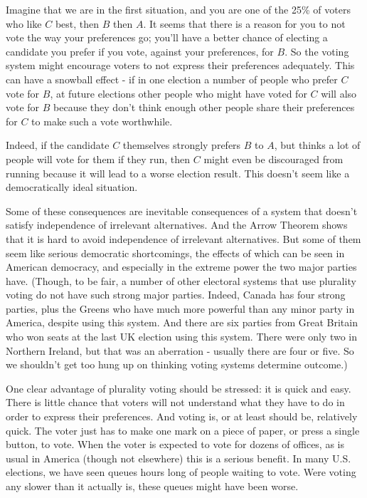 \documentclass[11pt,]{article}
\begin{document}
Imagine that we are in the first situation, and you are one of the 25\%
of voters who like \(C\) best, then \(B\) then \(A\). It seems that
there is a reason for you to not vote the way your preferences go;
you'll have a better chance of electing a candidate you prefer if you
vote, against your preferences, for \(B\). So the voting system might
encourage voters to not express their preferences adequately. This can
have a snowball effect - if in one election a number of people who
prefer \(C\) vote for \(B\), at future elections other people who might
have voted for \(C\) will also vote for \(B\) because they don't think
enough other people share their preferences for \(C\) to make such a
vote worthwhile.

Indeed, if the candidate \(C\) themselves strongly prefers \(B\) to
\(A\), but thinks a lot of people will vote for them if they run, then
\(C\) might even be discouraged from running because it will lead to a
worse election result. This doesn't seem like a democratically ideal
situation.

Some of these consequences are inevitable consequences of a system that
doesn't satisfy independence of irrelevant alternatives. And the Arrow
Theorem shows that it is hard to avoid independence of irrelevant
alternatives. But some of them seem like serious democratic
shortcomings, the effects of which can be seen in American democracy,
and especially in the extreme power the two major parties have. (Though,
to be fair, a number of other electoral systems that use plurality
voting do not have such strong major parties. Indeed, Canada has four
strong parties, plus the Greens who have much more powerful than any
minor party in America, despite using this system. And there are six
parties from Great Britain who won seats at the last UK election using
this system. There were only two in Northern Ireland, but that was an
aberration - usually there are four or five. So we shouldn't get too
hung up on thinking voting systems determine outcome.)

One clear advantage of plurality voting should be stressed: it is quick
and easy. There is little chance that voters will not understand what
they have to do in order to express their preferences. And voting is, or
at least should be, relatively quick. The voter just has to make one
mark on a piece of paper, or press a single button, to vote. When the
voter is expected to vote for dozens of offices, as is usual in America
(though not elsewhere) this is a serious benefit. In many U.S.
elections, we have seen queues hours long of people waiting to vote.
Were voting any slower than it actually is, these queues might have been
worse.
\end{document}
